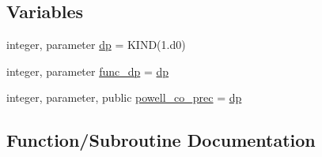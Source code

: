 \subsection*{Variables}
\begin{DoxyCompactItemize}
\item 
integer, parameter \mbox{\hyperlink{namespacepowell__constrainedoptimize_a8a0275c8eca26a533d0e5d9aef7b9eaa}{dp}} = K\+I\+ND(1.d0)
\item 
integer, parameter \mbox{\hyperlink{namespacepowell__constrainedoptimize_a09e82bbc40fa02c9929d47a2d1c56bdb}{func\+\_\+dp}} = \mbox{\hyperlink{namespacepowell__constrainedoptimize_a8a0275c8eca26a533d0e5d9aef7b9eaa}{dp}}
\item 
integer, parameter, public \mbox{\hyperlink{namespacepowell__constrainedoptimize_a18207be3e2f370a42332601cfccca22e}{powell\+\_\+co\+\_\+prec}} = \mbox{\hyperlink{namespacepowell__constrainedoptimize_a8a0275c8eca26a533d0e5d9aef7b9eaa}{dp}}
\end{DoxyCompactItemize}


\subsection{Function/\+Subroutine Documentation}
\mbox{\label{namespacepowell__constrainedoptimize_ad592264ce63370c7014ab5883330e26d}} 
